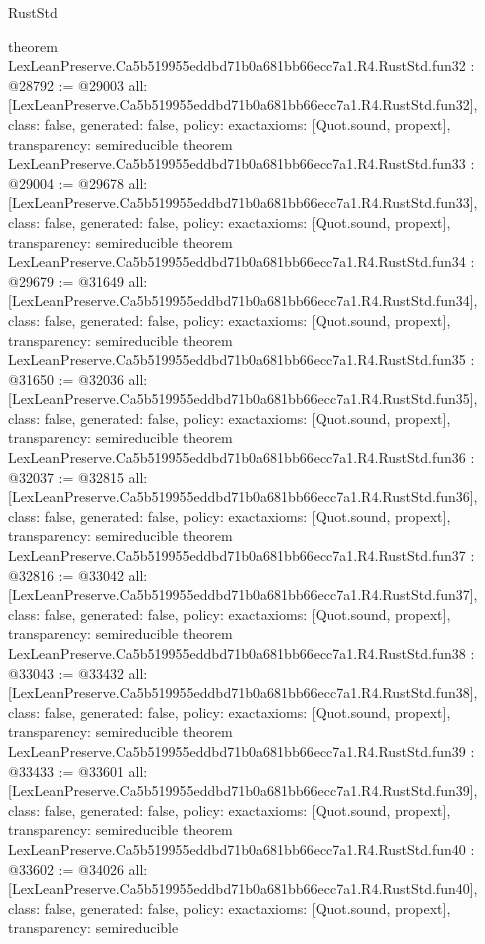 \begin{lexlean}{RustStd}
\begin{coremodule}
{}
theorem LexLeanPreserve.Ca5b519955eddbd71b0a681bb66ecc7a1.R4.RustStd.fun32 : @28792 := @29003 {
  all: [LexLeanPreserve.Ca5b519955eddbd71b0a681bb66ecc7a1.R4.RustStd.fun32],
  class: false,
  generated: false,
  policy: exact{axioms: [Quot.sound, propext]},
  transparency: semireducible
}
theorem LexLeanPreserve.Ca5b519955eddbd71b0a681bb66ecc7a1.R4.RustStd.fun33 : @29004 := @29678 {
  all: [LexLeanPreserve.Ca5b519955eddbd71b0a681bb66ecc7a1.R4.RustStd.fun33],
  class: false,
  generated: false,
  policy: exact{axioms: [Quot.sound, propext]},
  transparency: semireducible
}
theorem LexLeanPreserve.Ca5b519955eddbd71b0a681bb66ecc7a1.R4.RustStd.fun34 : @29679 := @31649 {
  all: [LexLeanPreserve.Ca5b519955eddbd71b0a681bb66ecc7a1.R4.RustStd.fun34],
  class: false,
  generated: false,
  policy: exact{axioms: [Quot.sound, propext]},
  transparency: semireducible
}
theorem LexLeanPreserve.Ca5b519955eddbd71b0a681bb66ecc7a1.R4.RustStd.fun35 : @31650 := @32036 {
  all: [LexLeanPreserve.Ca5b519955eddbd71b0a681bb66ecc7a1.R4.RustStd.fun35],
  class: false,
  generated: false,
  policy: exact{axioms: [Quot.sound, propext]},
  transparency: semireducible
}
theorem LexLeanPreserve.Ca5b519955eddbd71b0a681bb66ecc7a1.R4.RustStd.fun36 : @32037 := @32815 {
  all: [LexLeanPreserve.Ca5b519955eddbd71b0a681bb66ecc7a1.R4.RustStd.fun36],
  class: false,
  generated: false,
  policy: exact{axioms: [Quot.sound, propext]},
  transparency: semireducible
}
theorem LexLeanPreserve.Ca5b519955eddbd71b0a681bb66ecc7a1.R4.RustStd.fun37 : @32816 := @33042 {
  all: [LexLeanPreserve.Ca5b519955eddbd71b0a681bb66ecc7a1.R4.RustStd.fun37],
  class: false,
  generated: false,
  policy: exact{axioms: [Quot.sound, propext]},
  transparency: semireducible
}
theorem LexLeanPreserve.Ca5b519955eddbd71b0a681bb66ecc7a1.R4.RustStd.fun38 : @33043 := @33432 {
  all: [LexLeanPreserve.Ca5b519955eddbd71b0a681bb66ecc7a1.R4.RustStd.fun38],
  class: false,
  generated: false,
  policy: exact{axioms: [Quot.sound, propext]},
  transparency: semireducible
}
theorem LexLeanPreserve.Ca5b519955eddbd71b0a681bb66ecc7a1.R4.RustStd.fun39 : @33433 := @33601 {
  all: [LexLeanPreserve.Ca5b519955eddbd71b0a681bb66ecc7a1.R4.RustStd.fun39],
  class: false,
  generated: false,
  policy: exact{axioms: [Quot.sound, propext]},
  transparency: semireducible
}
theorem LexLeanPreserve.Ca5b519955eddbd71b0a681bb66ecc7a1.R4.RustStd.fun40 : @33602 := @34026 {
  all: [LexLeanPreserve.Ca5b519955eddbd71b0a681bb66ecc7a1.R4.RustStd.fun40],
  class: false,
  generated: false,
  policy: exact{axioms: [Quot.sound, propext]},
  transparency: semireducible
}
\end{coremodule}
\end{lexlean}
